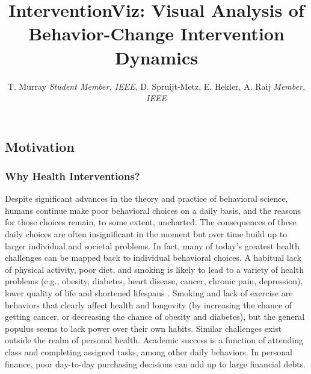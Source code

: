 \documentclass[review,journal]{vgtc}         %
\title{InterventionViz: Visual Analysis of Behavior-Change Intervention Dynamics}
\author{T. Murray \textit{Student Member, IEEE}, D. Spruijt-Metz, E. Hekler, A. Raij \textit{Member, IEEE}}
\begin{document}


\maketitle


\subsection{Motivation}

\subsubsection{Why Health Interventions?}
Despite significant advances in the theory and practice of behavioral science, humans continue make poor behavioral choices on a daily basis, and the reasons for those choices remain, to some extent, uncharted. 
The consequences of these daily choices are often insignificant in the moment but over time build up to larger individual and societal problems. 
In fact, many of today's greatest health challenges can be mapped back to individual behavioral choices.
A habitual lack of physical activity, poor diet, and smoking is likely to lead to a variety of health problems (e.g., obesity, diabetes, heart disease, cancer, chronic pain, depression), lower quality of life and shortened lifespans \cite{franco2005, dunn2001, yanbaeva2007, ross2000}. 
Smoking and lack of exercise are behaviors that clearly affect health and longevity (by increasing the chance of getting cancer, or decreasing the chance of obesity and diabetes), but the general populus seems to lack power over their own habits.
Similar challenges exist outside the realm of personal health. 
Academic success is a function of attending class and completing assigned tasks, among other daily behaviors\cite{cooper2006}.
In personal finance, poor day-to-day purchasing decisions can add up to large financial debts\cite{norvilitis2003}.
\end{document}
